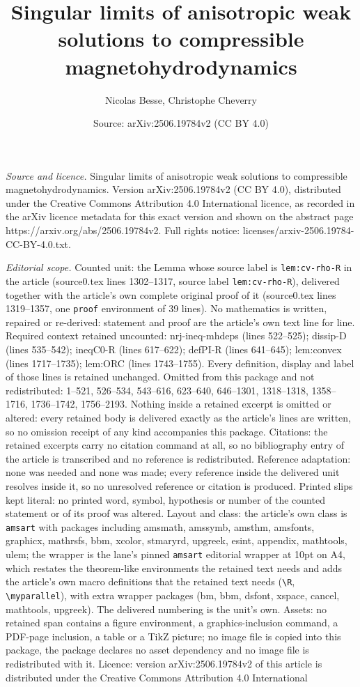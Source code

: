 \documentclass[10pt,a4paper]{amsart}
\title[Singular limits of anisotropic weak solutions to compressibl]{Singular limits of anisotropic weak solutions to compressible magnetohydrodynamics}
\author{Nicolas Besse, Christophe Cheverry}
\date{Source: arXiv:2506.19784v2 (CC BY 4.0)}
\begin{document}
\maketitle

\noindent\emph{Source and licence.} Singular limits of anisotropic weak solutions to compressible magnetohydrodynamics. Version arXiv:2506.19784v2 (CC BY 4.0), distributed under the Creative Commons Attribution 4.0 International licence, as recorded in the arXiv licence metadata for this exact version and shown on the abstract page https://arxiv.org/abs/2506.19784v2. Full rights notice: licenses/arxiv-2506.19784-CC-BY-4.0.txt.\par\smallskip

\noindent\textit{Editorial scope.} Counted unit: the Lemma whose source label is \texttt{lem:cv-rho-R} in the article (source0.tex lines 1302--1317, source label \texttt{lem:cv-rho-R}), delivered together with the article's own complete original proof of it (source0.tex lines 1319--1357, one \texttt{proof} environment of 39 lines). No mathematics is written, repaired or re-derived: statement and proof are the article's own text line for line. Required context retained uncounted: nrj-ineq-mhdeps (lines 522--525); dissip-D (lines 535--542); ineqC0-R (lines 617--622); defPI-R (lines 641--645); lem:convex (lines 1717--1735); lem:ORC (lines 1743--1755). Every definition, display and label of those lines is retained unchanged. Omitted from this package and not redistributed: 1--521, 526--534, 543--616, 623--640, 646--1301, 1318--1318, 1358--1716, 1736--1742, 1756--2193. Nothing inside a retained excerpt is omitted or altered: every retained body is delivered exactly as the article's lines are written, so no omission receipt of any kind accompanies this package. Citations: the retained excerpts carry no citation command at all, so no bibliography entry of the article is transcribed and no reference is redistributed. Reference adaptation: none was needed and none was made; every reference inside the delivered unit resolves inside it, so no unresolved reference or citation is produced. Printed slips kept literal: no printed word, symbol, hypothesis or number of the counted statement or of its proof was altered. Layout and class: the article's own class is \texttt{amsart} with packages including amsmath, amssymb, amsthm, amsfonts, graphicx, mathrsfs, bbm, xcolor, stmaryrd, upgreek, esint, appendix, mathtools, ulem; the wrapper is the lane's pinned \texttt{amsart} editorial wrapper at 10pt on A4, which restates the theorem-like environments the retained text needs and adds the article's own macro definitions that the retained text needs (\texttt{\textbackslash R}, \texttt{\textbackslash myparallel}), with extra wrapper packages (bm, bbm, dsfont, xspace, cancel, mathtools, upgreek). The delivered numbering is the unit's own. Assets: no retained span contains a figure environment, a graphics-inclusion command, a PDF-page inclusion, a table or a TikZ picture; no image file is copied into this package, the package declares no asset dependency and no image file is redistributed with it. Licence: version arXiv:2506.19784v2 of this article is distributed under the Creative Commons Attribution 4.0 International 
\end{document}
